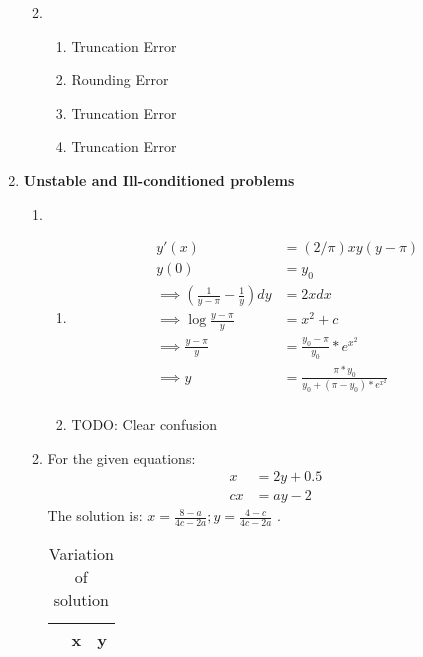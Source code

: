 \documentclass[11pt]{article}
\begin{document}
\begin{enumerate}
\begin{enumerate}
\begin{enumerate}
\begin{table}[!htb]
\begin{tabular}{|c|c|c|}
												\end{tabular}
												\end{table}
						\end{enumerate}
				\item %
						\begin{enumerate}
								\item Truncation Error
								\item Rounding Error
								\item Truncation Error
								\item Truncation Error
						\end{enumerate}
			\end{enumerate}
	\item \textbf{Unstable and Ill-conditioned problems} \\
			\begin{enumerate}
				\item 
					\begin{enumerate}
						\item 
								\begin{align*}
									y'(x) &= (2/\pi)xy(y-\pi) \\
									y(0) &= y_0 \\
									\implies (\frac{1}{y-\pi} -\frac{1}{y})dy &= 2x dx \\
										\implies \log{\frac{y-\pi}{y}} &= x^2 + c \\
								\implies \frac{y-\pi}{y} &= \frac{y_0 - \pi}{y_0} * e^{x^2} \\
									\implies y &= \frac{\pi *y_0}{y_0 + (\pi - y_0)*e^{x^2}} \\
								\end{align*}
						\item 
								TODO: Clear confusion
					\end{enumerate}
				\item 
						For the given equations: \\
						\begin{align*}
							x &= 2y + 0.5\\
							cx &= ay -2 
						\end{align*}
						The solution is: $x=\frac{8-a}{4c-2a} ; y = \frac{4-c}{4c - 2a}$ .\\
								\begin{table}[!htb]
								\centering
								\caption{Variation of solution}
								\label{my-label}
								\begin{tabular}{|l|l|l|}
								\hline
								\multicolumn{1}{|c|}{\textbf{}} & \multicolumn{1}{c|}{\textbf{x}} & \multicolumn{1}{c|}{\textbf{y}} \\ \hline

\end{tabular}
\end{table}
\end{enumerate}
\end{enumerate}
\end{document}
